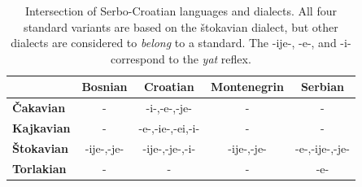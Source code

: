 \begin{table}
\centering
\begin{tabular}{lcccc}
  \hline
              &  \textbf{Bosnian} & \textbf{Croatian} & \textbf{Montenegrin} & \textbf{Serbian}\\
  \hline
 \textbf{Čakavian}  & - & -i-,-e-,-je- & - & -  \\
 \textbf{Kajkavian}  & - & -e-,-ie-,-ei,-i- & - & -  \\
 \textbf{Štokavian}  & -ije-,-je- & -ije-,-je-,-i- & -ije-,-je- & -e-,-ije-,-je-  \\
 \textbf{Torlakian}  & - & - & - & -e-  \\
\hline
\end{tabular}
\caption{Intersection of Serbo-Croatian languages and dialects. All four standard variants 
  are based on the štokavian dialect, but other dialects are considered to \emph{belong} to a 
  standard. The -ije-, -e-, and -i- correspond to the \emph{yat} reflex.}
\end{table}




